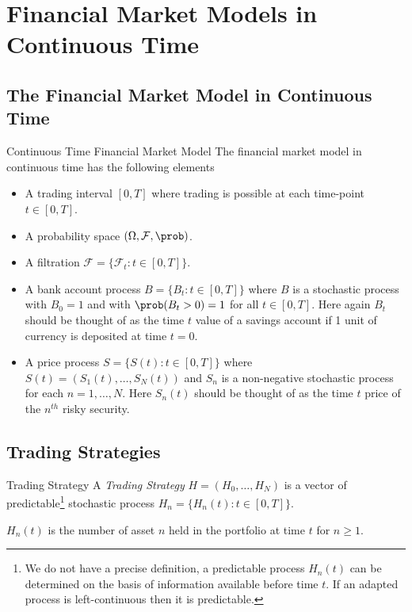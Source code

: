 \documentclass[11pt,a4paper]{article}
\begin{document}
\section{Financial Market Models in Continuous Time} \label{sec_financial_market_models_in_continuous_time}

\subsection{The Financial Market Model in Continuous Time}

  \begin{definition}{Continuous Time Financial Market Model}
    The financial market model in continuous time has the following elements
    \begin{itemize}
      \item A trading interval $[0,T]$ where trading is possible at each time-point $t\in[0,T]$.
      \item A probability space $(\Omega,\mathcal{F},\prob)$.
      \item A filtration $\mathcal{F}=\{\mathcal{F}_t:t\in[0,T]\}$.
      \item A bank account process $B=\{B_t:t\in[0,T]\}$ where $B$ is a stochastic process with $B_0=1$ and with $\prob(B_t>0)=1$ for all $t\in[0,T]$. Here again $B_t$ should be thought of as the time $t$ value of a savings account if 1 unit of currency is deposited at time $t=0$.
      \item A price process $S=\{S(t):t\in[0,T]\}$ where $S(t)=(S_1(t),\dots,S_N(t))$ and $S_n$ is a non-negative stochastic process for each $n=1,\dots,N$. Here $S_n(t)$ should be thought of as the time $t$ price of the $n^{th}$ risky security.
    \end{itemize}
  \end{definition}

\subsection{Trading Strategies}

  \begin{definition}{Trading Strategy}
    A \textit{Trading Strategy} $H=(H_0,\dots,H_N)$ is a vector of predictable\footnote{We do not have a precise definition, a predictable process $H_n(t)$ can be determined on the basis of information available before time $t$. If an adapted process is left-continuous then it is predictable.} stochastic process $H_n=\{H_n(t):t\in[0,T]\}$.
    \par $H_n(t)$ is the number of asset $n$ held in the portfolio at time $t$ for $n\geq1$.
  \end{definition}
\end{document}
